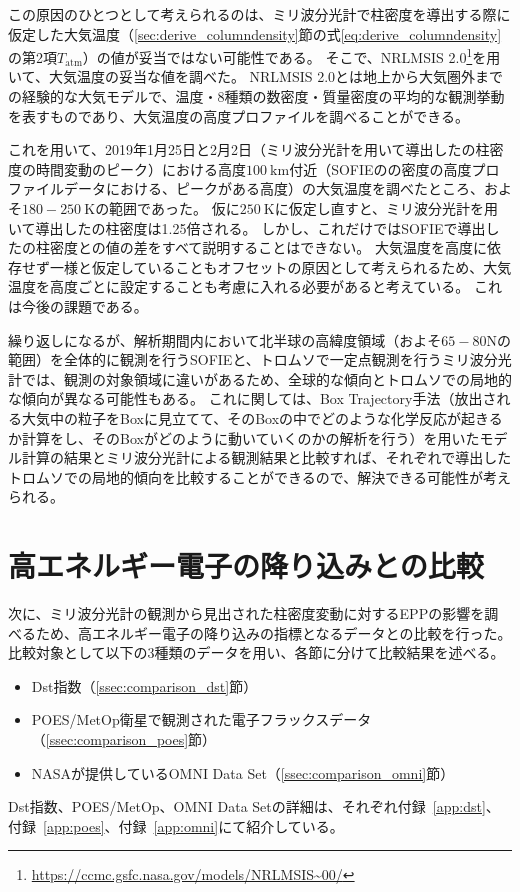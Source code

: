 この原因のひとつとして考えられるのは、ミリ波分光計で柱密度を導出する際に仮定した大気温度（\ref{sec:derive_columndensity}節の式\eqref{eq:derive_columndensity}の第2項$T_{\mathrm{atm}}$）の値が妥当ではない可能性である。
そこで、NRLMSIS 2.0\footnote{\url{https://ccmc.gsfc.nasa.gov/models/NRLMSIS~00/}}を用いて、大気温度の妥当な値を調べた。
NRLMSIS 2.0とは地上から大気圏外までの経験的な大気モデルで、温度・8種類の数密度・質量密度の平均的な観測挙動を表すものであり、大気温度の高度プロファイルを調べることができる。\par

これを用いて、2019年1月25日と2月2日（ミリ波分光計を用いて導出したの柱密度の時間変動のピーク）における高度$100\ \mathrm{km}$付近（SOFIEのの密度の高度プロファイルデータにおける、ピークがある高度）の大気温度を調べたところ、およそ$180-250\ \mathrm{K}$の範囲であった。
仮に$250\ \mathrm{K}$に仮定し直すと、ミリ波分光計を用いて導出したの柱密度は1.25倍される。
しかし、これだけではSOFIEで導出したの柱密度との値の差をすべて説明することはできない。
大気温度を高度に依存せず一様と仮定していることもオフセットの原因として考えられるため、大気温度を高度ごとに設定することも考慮に入れる必要があると考えている。
これは今後の課題である。\par

繰り返しになるが、解析期間内において北半球の高緯度領域（およそ$65 - 80$\textdegree Nの範囲）を全体的に観測を行うSOFIEと、トロムソで一定点観測を行うミリ波分光計では、観測の対象領域に違いがあるため、全球的な傾向とトロムソでの局地的な傾向が異なる可能性もある。
これに関しては、Box Trajectory手法（放出される大気中の粒子をBoxに見立てて、そのBoxの中でどのような化学反応が起きるか計算をし、そのBoxがどのように動いていくのかの解析を行う）を用いたモデル計算の結果とミリ波分光計による観測結果と比較すれば、それぞれで導出したトロムソでの局地的傾向を比較することができるので、解決できる可能性が考えられる。


\section{高エネルギー電子の降り込みとの比較}
\label{sec:comparison_eep}
次に、ミリ波分光計の観測から見出された柱密度変動に対するEPPの影響を調べるため、高エネルギー電子の降り込みの指標となるデータとの比較を行った。
比較対象として以下の3種類のデータを用い、各節に分けて比較結果を述べる。
\begin{itemize}
    \item Dst指数（\ref{ssec:comparison_dst}節）
    \item POES/MetOp衛星で観測された電子フラックスデータ（\ref{ssec:comparison_poes}節）
    \item NASAが提供しているOMNI Data Set（\ref{ssec:comparison_omni}節）
\end{itemize} \par
Dst指数、POES/MetOp、OMNI Data Setの詳細は、それぞれ付録~\ref{app:dst}、付録~\ref{app:poes}、付録~\ref{app:omni}にて紹介している。


